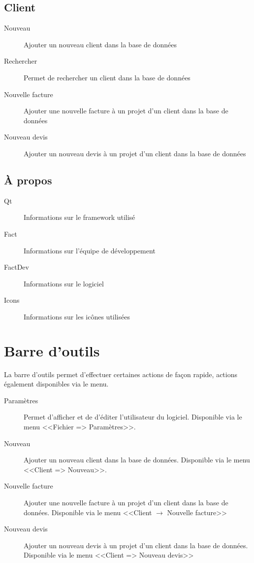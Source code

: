 \subsection{Client}
\begin{description}
	\item[Nouveau] Ajouter un nouveau client dans la base de données
	\item[Rechercher] Permet de rechercher un client dans la base de données
	\item[Nouvelle facture]  Ajouter une nouvelle facture à un projet d’un client dans la base de données
	\item[Nouveau devis] Ajouter un nouveau devis à un projet d’un client dans la base de données
\end{description}
\subsection{À propos}
\begin{description}
	\item[Qt] Informations sur le framework utilisé
	\item[Fact] Informations sur l'équipe de développement
	\item[FactDev]Informations sur le logiciel
	\item[Icons] Informations sur les icônes utilisées
\end{description}
\section{Barre d'outils}
La barre d’outils permet d’effectuer certaines actions de façon rapide, actions également disponibles via le menu.

\begin{description}
	\item[Paramètres] Permet d'afficher et de d’éditer l'utilisateur du logiciel. Disponible via le menu <<Fichier => Paramètres>>.
	\item[Nouveau] Ajouter un nouveau client dans la base de données. Disponible via le menu <<Client => Nouveau>>.
	\item[Nouvelle facture]  Ajouter une nouvelle facture à un projet d’un client dans la base de données. Disponible via le menu <<Client
		$\rightarrow$
		Nouvelle facture>>
	\item[Nouveau devis] Ajouter un nouveau devis à un projet d’un client dans la base de données. Disponible via le menu <<Client => Nouveau
		devis>>
\end{description}

